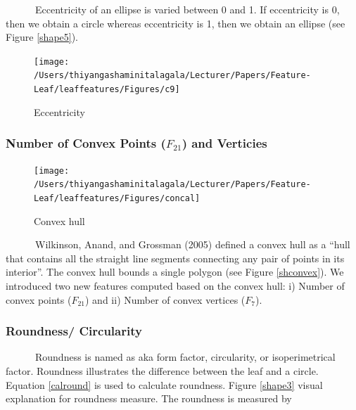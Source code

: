 \documentclass{article}
\begin{document}
~~~~~~Eccentricity of an ellipse is varied between 0 and 1. If
eccentricity is 0, then we obtain a circle whereas eccentricity is 1,
then we obtain an ellipse (see Figure \ref{shape5}).

\begin{figure}[!ht]

{\centering \texttt{[image: /Users/thiyangashaminitalagala/Lecturer/Papers/Feature-Leaf/leaffeatures/Figures/c9]} 

}

\caption{\label{shape5}Eccentricity}\label{fig:unnamed-chunk-19}
\end{figure}

\newpage

\hypertarget{number-of-convex-points-f_21-and-verticies}{%
\subsubsection{\texorpdfstring{Number of Convex Points (\(F_{21}\)) and
Verticies}{Number of Convex Points (F\_\{21\}) and Verticies}}\label{number-of-convex-points-f_21-and-verticies}}

\begin{figure}[!ht]

{\centering \texttt{[image: /Users/thiyangashaminitalagala/Lecturer/Papers/Feature-Leaf/leaffeatures/Figures/concal]} 

}

\caption{\label{shconvex}Convex hull}\label{fig:unnamed-chunk-20}
\end{figure}

~~~~~~Wilkinson, Anand, and Grossman (2005) defined a convex hull as a
``hull that contains all the straight line segments connecting any pair
of points in its interior''. The convex hull bounds a single polygon
(see Figure \ref{shconvex}). We introduced two new features computed
based on the convex hull: i) Number of convex points (\(F_{21}\)) and
ii) Number of convex vertices (\(F_7\)).

\hypertarget{roundness-circularity}{%
\subsubsection{Roundness/ Circularity}\label{roundness-circularity}}

~~~~~~Roundness is named as aka form factor, circularity, or
isoperimetrical factor. Roundness illustrates the difference between the
leaf and a circle. Equation \ref{calround} is used to calculate
roundness. Figure \ref{shape3} visual explanation for roundness measure.
The roundness is measured by
\end{document}
